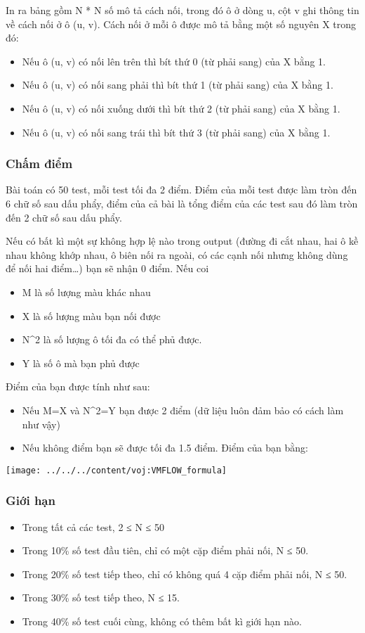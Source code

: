 In ra bảng gồm N * N số mô tả cách nối, trong đó ô ở dòng u, cột v ghi thông tin về cách nối ở ô (u, v). Cách nối ở mỗi ô được mô tả bằng một số nguyên X trong đó:
\begin{itemize}
	\item Nếu ô (u, v) có nối lên trên thì bít thứ 0 (từ phải sang) của X bằng 1.
	\item Nếu ô (u, v) có nối sang phải thì bít thứ 1 (từ phải sang) của X bằng 1.
	\item Nếu ô (u, v) có nối xuống dưới thì bít thứ 2 (từ phải sang) của X bằng 1.
	\item Nếu ô (u, v) có nối sang trái thì bít thứ 3 (từ phải sang) của X bằng 1.
\end{itemize}

\subsubsection{Chấm điểm}

Bài toán có 50 test, mỗi test tối đa 2 điểm. Điểm của mỗi test được làm tròn đến 6 chữ số sau dấu phẩy, điểm của cả bài là tổng điểm của các test sau đó làm tròn đến 2 chữ số sau dấu phẩy.

Nếu có bất kì một sự không hợp lệ nào trong output (đường đi cắt nhau, hai ô kề nhau không khớp nhau, ô biên nối ra ngoài, có các cạnh nối nhưng không dùng để nối hai điểm…) bạn sẽ nhận 0 điểm. Nếu coi 
\begin{itemize}
	\item M là số lượng màu khác nhau
	\item X là số lượng màu bạn nối được
	\item N\textasciicircum2 là số lượng ô tối đa có thể phủ được.
	\item Y là số ô mà bạn phủ được
\end{itemize}

Điểm của bạn được tính như sau:
\begin{itemize}
	\item Nếu M=X và N\textasciicircum2=Y bạn được 2 điểm (dữ liệu luôn đảm bảo có cách làm như vậy)
	\item Nếu không điểm bạn sẽ được tối đa 1.5 điểm. Điểm của bạn bằng:
\end{itemize}


\texttt{[image: ../../../content/voj:VMFLOW\_formula]}

\subsubsection{Giới hạn}
\begin{itemize}
	\item Trong tất cả các test, 2 ≤ N ≤ 50
	\item Trong 10\% số test đầu tiên, chỉ có một cặp điểm phải nối, N ≤ 50.
	\item Trong 20\% số test tiếp theo, chỉ có không quá 4 cặp điểm phải nối, N ≤ 50.
	\item Trong 30\% số test tiếp theo, N ≤ 15.
	\item Trong 40\% số test cuối cùng, không có thêm bất kì giới hạn nào.
\end{itemize}

